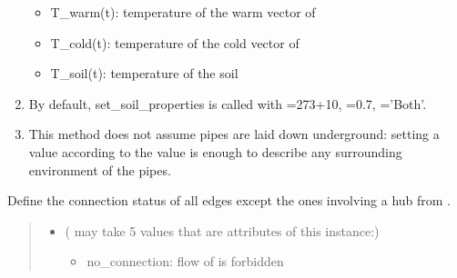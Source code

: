 \documentclass[letterpaper,10pt,english]{sphinxmanual}
\begin{document}
\begin{fulllineitems}
\begin{fulllineitems}
\begin{enumerate}
\begin{itemize}
\item {} 
\sphinxAtStartPar
T\_warm(t): temperature of the warm vector of 

\item {} 
\sphinxAtStartPar
T\_cold(t): temperature of the cold vector of 

\item {} 
\sphinxAtStartPar
T\_soil(t): temperature of the soil

\end{itemize}

\item {} 
\sphinxAtStartPar
By default, set\_soil\_properties is called with  =273+10,  =0.7,  =’Both’.

\item {} 
\sphinxAtStartPar
This method does not assume pipes are laid down underground: setting a  value according to the 
value is enough to describe any surrounding environment of the pipes.

\end{enumerate}

\end{fulllineitems}


\begin{fulllineitems}
\label{\detokenize{generated/tamos.network.HREThermalNetwork:tamos.network.HREThermalNetwork.set_status}}
\pysigstartsignatures
{}
\pysigstopsignatures
\sphinxAtStartPar
Define the connection status of all edges except the ones involving a hub from .
\begin{quote}\begin{description}
\begin{itemize}
\item {} 
\sphinxAtStartPar
{} ( may take 5 values that are attributes of this instance:) \textendash{} \begin{itemize}
\item {} 
\sphinxAtStartPar
no\_connection: flow of  is forbidden


\end{itemize}
\end{itemize}
\end{description}
\end{quote}
\end{fulllineitems}
\end{fulllineitems}
\end{document}
